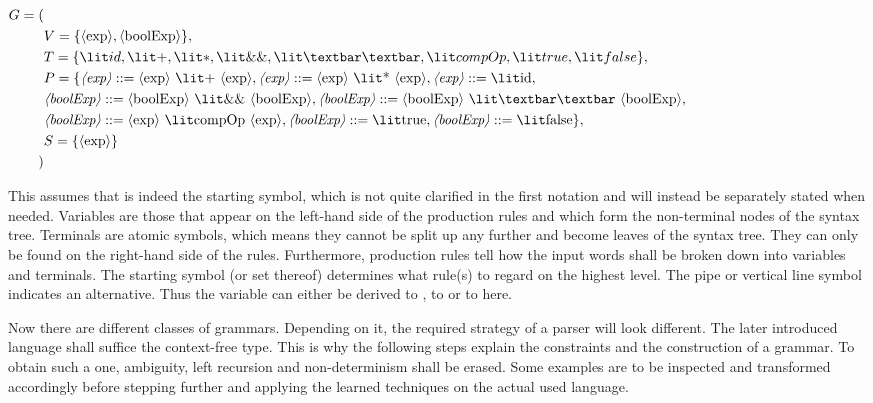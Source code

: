 \begin{math}
\begin{aligned}
G ={} ( \\
		& V = \{\textnonterminal{exp}, \textnonterminal{boolExp}\}, \\
		& T = \{\textterminal{id}, \textterminal{+}, \textterminal{*}, \textterminal{\&\&}, \textterminal{\textbar\textbar}, \textterminal{compOp}, \textterminal{true}, \textterminal{false}\}, \\
		& P = \{ \mathrule{exp}{\textnonterminal{exp} \textterminal{+} \textnonterminal{exp}}, \mathrule{exp}{\textnonterminal{exp} \textterminal{*} \textnonterminal{exp}}, \mathrule{exp}{\textterminal{id}}, \\
		& \mathrule{boolExp}{\textnonterminal{boolExp} \textterminal{\&\&} \textnonterminal{boolExp}}, \mathrule{boolExp}{\textnonterminal{boolExp} \textterminal{\textbar\textbar} \textnonterminal{boolExp}}, \\
		& \mathrule{boolExp}{\textnonterminal{exp} \textterminal{compOp} \textnonterminal{exp}}, \mathrule{boolExp}{\textterminal{true}}, \mathrule{boolExp}{\textterminal{false}} \}, \\
		& S = \{\textnonterminal{exp}\} \\
)
\end{aligned}
\end{math}

This assumes that  is indeed the starting symbol, which is not quite clarified in the first notation and will instead be separately stated when needed. Variables are those that appear on the left-hand side of the production rules and which form the non-terminal nodes of the syntax tree. Terminals are atomic symbols, which means they cannot be split up any further and become leaves of the syntax tree. They can only be found on the right-hand side of the rules. Furthermore, production rules tell how the input words shall be broken down into variables and terminals. The starting symbol (or set thereof) determines what rule(s) to regard on the highest level. The pipe or vertical line symbol \textbar{} indicates an alternative. Thus the variable  can either be derived to , to  or to  here.

Now there are different classes of grammars. Depending on it, the required strategy of a parser will look different. The later introduced language shall suffice the context-free \textlang{} type. This is why the following steps explain the constraints and the construction of a \textlang{} grammar. To obtain such a one, ambiguity, left recursion and non-determinism shall be erased. Some examples are to be inspected and transformed accordingly before stepping further and applying the learned techniques on the actual used language.

